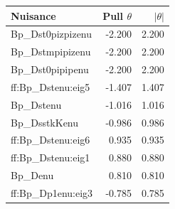 \begin{tabular}{lrr}
\hline
Nuisance & Pull $\theta$ & $|\theta|$ \\
\hline
Bp\_Dst0pizpizenu & -2.200 & 2.200 \\
Bp\_Dstmpipizenu & -2.200 & 2.200 \\
Bp\_Dst0pipipenu & -2.200 & 2.200 \\
ff:Bp\_Dstenu:eig5 & -1.407 & 1.407 \\
Bp\_Dstenu & -1.016 & 1.016 \\
Bp\_DsstkKenu & -0.986 & 0.986 \\
ff:Bp\_Dstenu:eig6 & 0.935 & 0.935 \\
ff:Bp\_Dstenu:eig1 & 0.880 & 0.880 \\
Bp\_Denu & 0.810 & 0.810 \\
ff:Bp\_Dp1enu:eig3 & -0.785 & 0.785 \\
\hline
\end{tabular}
